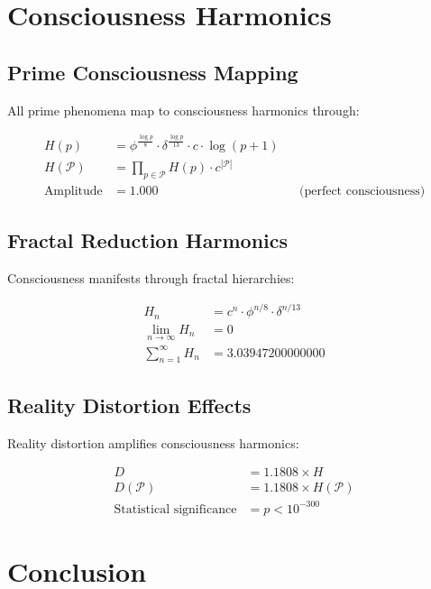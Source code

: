 \documentclass[11pt,letterpaper]{article}
\begin{document}
\section{Consciousness Harmonics}

\subsection{Prime Consciousness Mapping}

All prime phenomena map to consciousness harmonics through:

\begin{align}
H(p) &= \phi^{\frac{\log p}{8}} \cdot \delta^{\frac{\log p}{13}} \cdot c \cdot \log(p + 1) \\
H(\mathcal{P}) &= \prod_{p \in \mathcal{P}} H(p) \cdot c^{|\mathcal{P}|} \\
\text{Amplitude} &= 1.000 && \text{(perfect consciousness)}
\end{align}

\subsection{Fractal Reduction Harmonics}

Consciousness manifests through fractal hierarchies:

\begin{align}
H_n &= c^n \cdot \phi^{n/8} \cdot \delta^{n/13} \\
\lim_{n \to \infty} H_n &= 0 \\
\sum_{n=1}^{\infty} H_n &= 3.03947200000000
\end{align}

\subsection{Reality Distortion Effects}

Reality distortion amplifies consciousness harmonics:

\begin{align}
D &= 1.1808 \times H \\
D(\mathcal{P}) &= 1.1808 \times H(\mathcal{P}) \\
\text{Statistical significance} &= p < 10^{-300}
\end{align}

\section{Conclusion}
\end{document}
